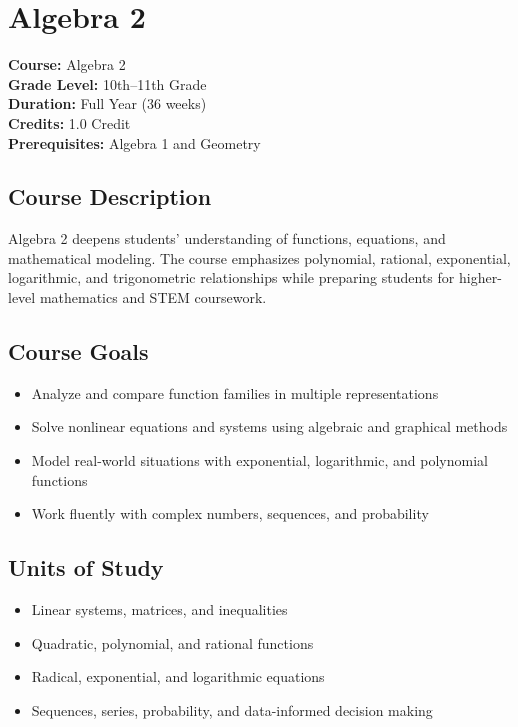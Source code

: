 \documentclass[12pt,oneside]{book}
\begin{document}
\chapter{Algebra 2}

\noindent\textbf{Course:} Algebra 2\\
\textbf{Grade Level:} 10th--11th Grade\\
\textbf{Duration:} Full Year (36 weeks)\\
\textbf{Credits:} 1.0 Credit\\
\textbf{Prerequisites:} Algebra 1 and Geometry

\section{Course Description}
Algebra 2 deepens students' understanding of functions, equations, and mathematical modeling. The course
emphasizes polynomial, rational, exponential, logarithmic, and trigonometric relationships while preparing
students for higher-level mathematics and STEM coursework.

\section{Course Goals}
\begin{itemize}[leftmargin=2em]
    \item Analyze and compare function families in multiple representations
    \item Solve nonlinear equations and systems using algebraic and graphical methods
    \item Model real-world situations with exponential, logarithmic, and polynomial functions
    \item Work fluently with complex numbers, sequences, and probability
\end{itemize}

\section{Units of Study}
\begin{itemize}[leftmargin=2em]
    \item Linear systems, matrices, and inequalities
    \item Quadratic, polynomial, and rational functions
    \item Radical, exponential, and logarithmic equations
    \item Sequences, series, probability, and data-informed decision making
\end{itemize}
\end{document}
